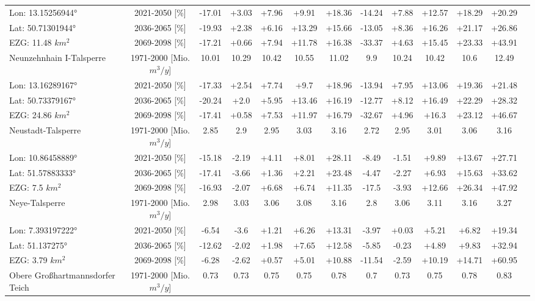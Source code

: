 \begin{longtable}{@{\extracolsep{\fill}}lc|ccccc||cccccc}
\cline{2-13} 
Lon: 13.15256944° & 2021-2050 [\%]  & -17.01 & +3.03 & +7.96 & +9.91 & +18.36 & -14.24 & +7.88 & +12.57 & +18.29 & +20.29 & \\ 
Lat: 50.71301944° & 2036-2065 [\%]  & -19.93 & +2.38 & +6.16 & +13.29 & +15.66 & -13.05 & +8.36 & +16.26 & +21.17 & +26.86 & \\ 
EZG: 11.48 $km^2$ & 2069-2098 [\%]  & -17.21 & +0.66 & +7.94 & +11.78 & +16.38 & -33.37 & +4.63 & +15.45 & +23.33 & +43.91 & \\ 
\hline 
Neunzehnhain I-Talsperre & 1971-2000 [Mio. $m^3/y$]  & 10.01 & 10.29 & 10.42 & 10.55 & 11.02 & 9.9 & 10.24 & 10.42 & 10.6 & 12.49 & \\ 
\cline{2-13} 
Lon: 13.16289167° & 2021-2050 [\%]  & -17.33 & +2.54 & +7.74 & +9.7 & +18.96 & -13.94 & +7.95 & +13.06 & +19.36 & +21.48 & \\ 
Lat: 50.73379167° & 2036-2065 [\%]  & -20.24 & +2.0 & +5.95 & +13.46 & +16.19 & -12.77 & +8.12 & +16.49 & +22.29 & +28.32 & \\ 
EZG: 24.86 $km^2$ & 2069-2098 [\%]  & -17.41 & +0.58 & +7.53 & +11.97 & +16.79 & -32.67 & +4.96 & +16.3 & +23.12 & +46.67 & \\ 
\hline 
Neustadt-Talsperre & 1971-2000 [Mio. $m^3/y$]  & 2.85 & 2.9 & 2.95 & 3.03 & 3.16 & 2.72 & 2.95 & 3.01 & 3.06 & 3.16 & \\ 
\cline{2-13} 
Lon: 10.86458889° & 2021-2050 [\%]  & -15.18 & -2.19 & +4.11 & +8.01 & +28.11 & -8.49 & -1.51 & +9.89 & +13.67 & +27.71 & \\ 
Lat: 51.57883333° & 2036-2065 [\%]  & -17.41 & -3.66 & +1.36 & +2.21 & +23.48 & -4.47 & -2.27 & +6.93 & +15.63 & +33.62 & \\ 
EZG: 7.5 $km^2$ & 2069-2098 [\%]  & -16.93 & -2.07 & +6.68 & +6.74 & +11.35 & -17.5 & -3.93 & +12.66 & +26.34 & +47.92 & \\ 
\hline 
Neye-Talsperre & 1971-2000 [Mio. $m^3/y$]  & 2.98 & 3.03 & 3.06 & 3.08 & 3.16 & 2.8 & 3.06 & 3.11 & 3.16 & 3.27 & \\ 
\cline{2-13} 
Lon: 7.393197222° & 2021-2050 [\%]  & -6.54 & -3.6 & +1.21 & +6.26 & +13.31 & -3.97 & +0.03 & +5.21 & +6.82 & +19.34 & \\ 
Lat: 51.137275° & 2036-2065 [\%]  & -12.62 & -2.02 & +1.98 & +7.65 & +12.58 & -5.85 & -0.23 & +4.89 & +9.83 & +32.94 & \\ 
EZG: 3.79 $km^2$ & 2069-2098 [\%]  & -6.28 & -2.62 & +0.57 & +5.01 & +10.88 & -11.54 & -2.59 & +10.19 & +14.71 & +60.95 & \\ 
\hline 
Obere Großhartmannsdorfer Teich & 1971-2000 [Mio. $m^3/y$]  & 0.73 & 0.73 & 0.75 & 0.75 & 0.78 & 0.7 & 0.73 & 0.75 & 0.78 & 0.83 & \\ 

\end{longtable}
